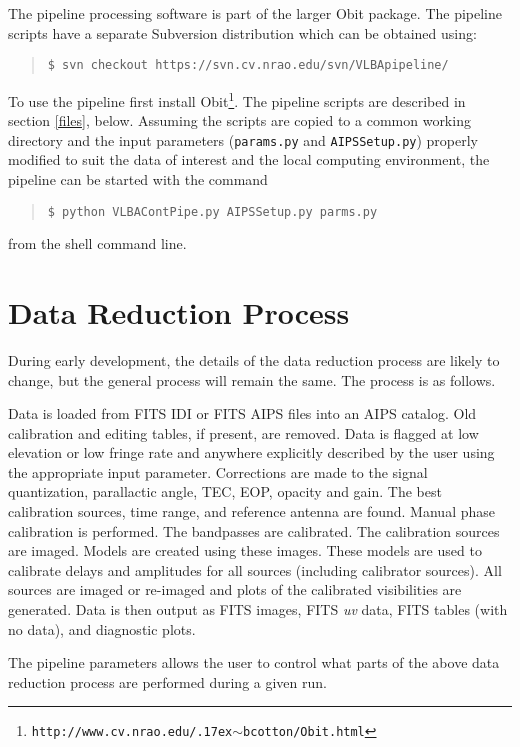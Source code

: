 \documentclass[10pt,onecolumn,final]{IEEEtran}
\renewcommand{\tilde}{\raise.17ex\hbox{$\scriptstyle\mathtt{\sim}$}}
\begin{document}
The pipeline processing software is part of the larger Obit
package\cite{Cotton:Obit}.  
The pipeline scripts have a separate Subversion distribution which can
be obtained using:
\begin{quote}\tt \$ svn checkout https://svn.cv.nrao.edu/svn/VLBApipeline/\end{quote}
To use the pipeline first install
Obit\footnote{\tt http://www.cv.nrao.edu/{\tilde}bcotton/Obit.html}.
The pipeline scripts are described in section \ref{files}, below.
Assuming the scripts are copied to a common working directory and the
input parameters ({\tt params.py} and {\tt AIPSSetup.py}) properly
modified to suit the data of interest and the local computing
environment, the pipeline can be started with the command       
\begin{quote}\tt \$ python VLBAContPipe.py AIPSSetup.py parms.py\end{quote}
from the shell command line.

\section{Data Reduction Process}

During early development, the details of the data reduction process
are likely to change, but the general process will remain the same.
The process is as follows.  

Data is loaded from FITS IDI or FITS AIPS files into an AIPS catalog.
Old calibration and editing tables, if present, are removed.  
Data is flagged at low elevation or low fringe rate and
anywhere explicitly described by the user using the appropriate input
parameter.  Corrections are made to the signal quantization,
parallactic angle, TEC, EOP, opacity and gain. 
The best calibration sources,
time range, and reference antenna are found.  Manual phase calibration
is performed.  The bandpasses are calibrated.  The calibration sources
are imaged.  Models are created using these images.  These models are
used to calibrate delays and amplitudes for all sources (including
calibrator sources).  All sources are imaged or re-imaged and  plots
of the calibrated visibilities are generated.  Data is then output as
FITS images, FITS {\em uv} data, FITS tables (with no data), and
diagnostic plots.

The pipeline parameters allows the user to control what parts of the
above data reduction process are performed during a given run.  
\end{document}
